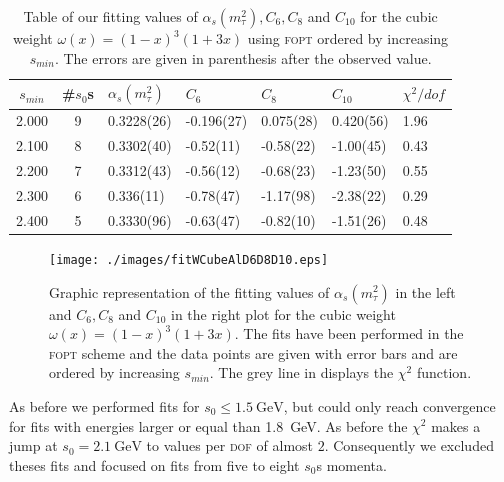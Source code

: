 \documentclass[../../index.tex]{subfiles}
\begin{document}
\begin{table}
  \centering
  \begin{tabularx}{\textwidth}{ccYYYYY}
    \toprule
    \(s_{min}\) & \#\(s_0\)s & \(\alpha_s(m_\tau^2)\) & \(C_6\) & \(C_8\) & \(C_{10}\) & \(\chi^2/dof\)  \\
    \midrule
    2.000 & 9 & 0.3228(26) & -0.196(27) & 0.075(28) & 0.420(56) & 1.96 \\
    2.100 & 8 & 0.3302(40) & -0.52(11) & -0.58(22) & -1.00(45) & 0.43 \\
    2.200 & 7 & 0.3312(43) & -0.56(12) & -0.68(23) & -1.23(50) & 0.55 \\
    2.300 & 6 & 0.336(11) & -0.78(47) & -1.17(98) & -2.38(22) & 0.29 \\
    2.400 & 5 & 0.3330(96) & -0.63(47) & -0.82(10) & -1.51(26) & 0.48 \\
    \bottomrule
  \end{tabularx}
  \caption{Table of our fitting values of \(\alpha_s(m_\tau^2), C_6, C_8\) and
    \(C_{10}\) for the cubic weight \(\omega(x)=(1-x)^3(1+3x)\) using
    \textsc{fopt} ordered by increasing \(s_{min}\). The errors are given in
    parenthesis after the observed value.}
  \label{table:fitWCubicAlD6D8D10}
\end{table}
\begin{figure}
  \centering \texttt{[image: ./images/fitWCubeAlD6D8D10.eps]}
  \caption{Graphic representation of the fitting values of
    \(\alpha_s(m_\tau^2)\) in the left and \(C_6, C_8\) and \(C_{10}\) in the
    right plot for the cubic weight \(\omega(x)=(1-x)^3(1+3x)\). The fits have
    been performed in the \textsc{fopt} scheme and the data points are given
    with error bars and are ordered by increasing \(s_{min}\). The grey line in
    displays the \(\chi^2\) function.}
  \label{fig:fitWCubeAlpha}
\end{figure}

As before we performed fits for \(s_0 \leq \SI{1.5}{\giga\eV}\), but could only
reach convergence for fits with energies larger or equal than
\SI{1.8}{\giga\eV}. As before the \(\chi^2\) makes a jump at
\(s_0=\SI{2.1}{\giga\eV}\) to values per \textsc{dof} of almost \(2\).
Consequently we excluded theses fits and focused on fits from five to eight
\(s_0\)s momenta.
\end{document}
